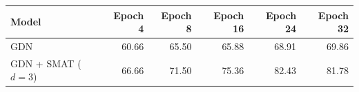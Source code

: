 \begin{tabular}{lrrrrr}
\toprule
Model & Epoch 4 & Epoch 8 & Epoch 16 & Epoch 24 & Epoch 32 \\
\midrule
GDN & 60.66 & 65.50 & 65.88 & 68.91 & 69.86 \\
GDN + SMAT ($d=3$) & 66.66 & 71.50 & 75.36 & 82.43 & 81.78 \\
\bottomrule
\end{tabular}
